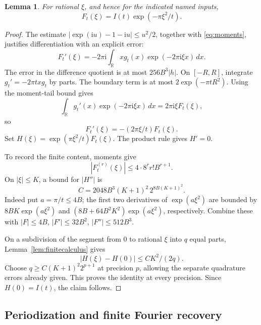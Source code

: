 \documentclass[11pt,letterpaper]{article}
\numberwithin{equation}{section}
\newtheorem{lemma}[theorem]{Lemma}
\theoremstyle{definition}
\newcommand{\R}{\mathbb R}
\newcommand{\ii}{\mathrm i}
\begin{document}
\begin{lemma}\label{lem:gaussianfourier}
For rational \(\xi\), and hence for the indicated named inputs,
\begin{equation}
                F_t(\xi)=I(t)\exp(-\pi\xi^2/t).
                \label{eq:gaussianfourier}
\end{equation}
\end{lemma}

\begin{proof}
The estimate
\(|\exp(\ii u)-1-\ii u|\le u^2/2\), together with
\eqref{eq:moments}, justifies differentiation with an explicit error:
\begin{equation}
 F_t'(\xi)=-2\pi\ii\int_\R xg_t(x)\exp(-2\pi\ii\xi x)\,dx.
 \label{eq:Fourierderivative}
\end{equation}
The error in the difference quotient is at most \(256B^3|h|\).
On \([-R,R]\), integrate \(g_t'=-2\pi txg_t\) by parts.
The boundary term is at most \(2\exp(-\pi tR^2)\).
Using the moment-tail bound gives
\[
 \int_\R g_t'(x)\exp(-2\pi\ii\xi x)\,dx
       =2\pi\ii\xi F_t(\xi),
\]
so
\[
                    F_t'(\xi)=-(2\pi\xi/t)F_t(\xi).
\]
Set \(H(\xi)=\exp(\pi\xi^2/t)F_t(\xi)\). The product rule gives
\(H'=0\).

To record the finite content, moments give
\[
 |F_t^{(r)}(\xi)|\le4\cdot8^r r!B^{r+1}.
\]
On \(|\xi|\le K\), a bound for \(|H''|\) is
\begin{equation}
 C=2048B^3(K+1)^2\,2^{8B(K+1)^2}.                         \label{eq:Hsecond}
\end{equation}
Indeed put \(a=\pi/t\le4B\); the first two derivatives of
\(\exp(a\xi^2)\) are bounded by
\(8BK\exp(a\xi^2)\) and
\((8B+64B^2K^2)\exp(a\xi^2)\), respectively.
Combine these with \(|F|\le4B\), \(|F'|\le32B^2\),
\(|F''|\le512B^3\).

On a subdivision of the segment from \(0\) to rational \(\xi\)
into \(q\) equal parts, Lemma~\ref{lem:finitecalculus} gives
\[
                 |H(\xi)-H(0)|\le CK^2/(2q).
\]
Choose \(q\ge C(K+1)^2 2^{p+1}\) at precision \(p\), allowing the
separate quadrature errors already given. This proves the identity
at every precision. Since \(H(0)=I(t)\), the claim follows.
\end{proof}

\subsection{Periodization and finite Fourier recovery}
\end{document}
